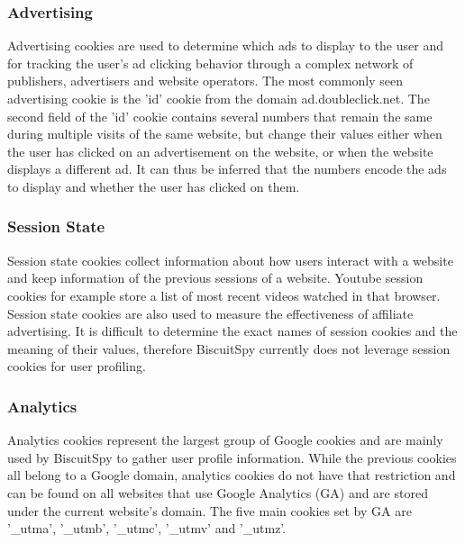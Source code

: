 \subsubsection{Advertising}
Advertising cookies are used to determine which ads to display to the user and for tracking the user's ad clicking behavior through a complex network of publishers, advertisers and website operators. The most commonly seen advertising cookie is the 'id' cookie from the domain ad.doubleclick.net. The second field of the 'id' cookie contains several numbers that remain the same during multiple visits of the same website, but change their values either when the user has clicked on an advertisement on the website, or when the website displays a different ad. It can thus be inferred that the numbers encode the ads to display and whether the user has clicked on them.

\subsubsection{Session State}
Session state cookies collect information about how users interact with a website and keep information of the previous sessions of a website. Youtube session cookies for example store a list of most recent videos watched in that browser. Session state cookies are also used to measure the effectiveness of affiliate advertising. It is difficult to determine the exact names of session cookies and the meaning of their values, therefore BiscuitSpy currently does not leverage session cookies for user profiling.

\subsubsection{Analytics}
Analytics cookies represent the largest group of Google cookies and are mainly used by BiscuitSpy to gather user profile information. While the previous cookies all belong to a Google domain, analytics cookies do not have that restriction and can be found on all websites that use Google Analytics (GA) and are stored under the current website's domain. The five main cookies set by GA are  '\_utma',  '\_utmb', '\_utmc', '\_utmv' and '\_utmz'. 

